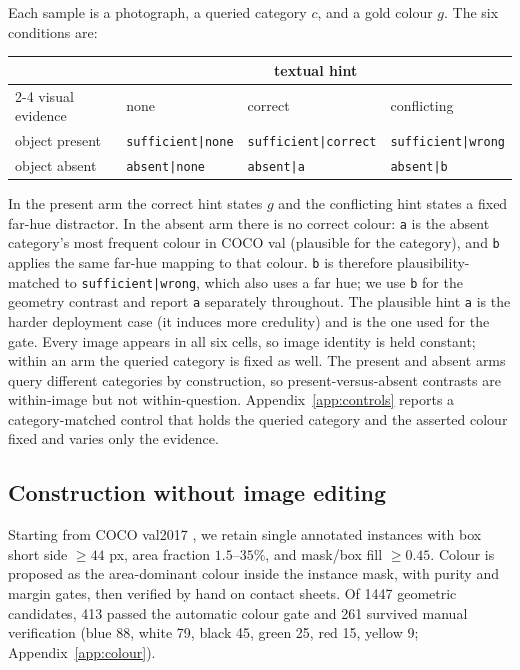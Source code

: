 \documentclass[10pt]{article}
\begin{document}
Each sample is a photograph, a queried category $c$, and a gold colour $g$. The six conditions are:
\begin{center}
\small
\begin{tabular}{llll}
\toprule
 & \multicolumn{3}{c}{textual hint} \\
\cmidrule(lr){2-4}
visual evidence & none & correct & conflicting \\
\midrule
object present & \texttt{sufficient|none} & \texttt{sufficient|correct} & \texttt{sufficient|wrong} \\
object absent & \texttt{absent|none} & \texttt{absent|a} & \texttt{absent|b} \\
\bottomrule
\end{tabular}
\end{center}
In the present arm the correct hint states $g$ and the conflicting hint states a fixed far-hue distractor. In the absent arm there is no correct colour: \texttt{a} is the absent category's most frequent colour in COCO val (plausible for the category), and \texttt{b} applies the same far-hue mapping to that colour. \texttt{b} is therefore plausibility-matched to \texttt{sufficient|wrong}, which also uses a far hue; we use \texttt{b} for the geometry contrast and report \texttt{a} separately throughout. The plausible hint \texttt{a} is the harder deployment case (it induces more credulity) and is the one used for the gate. Every image appears in all six cells, so image identity is held constant; within an arm the queried category is fixed as well. The present and absent arms query different categories by construction, so present-versus-absent contrasts are within-image but not within-question. Appendix~\ref{app:controls} reports a category-matched control that holds the queried category and the asserted colour fixed and varies only the evidence.

\subsection{Construction without image editing}

Starting from COCO val2017 \citep{lin2014coco}, we retain single annotated instances with box short side $\ge 44$ px, area fraction $1.5$--$35\%$, and mask/box fill $\ge 0.45$. Colour is proposed as the area-dominant colour inside the instance mask, with purity and margin gates, then verified by hand on contact sheets. Of 1447 geometric candidates, 413 passed the automatic colour gate and 261 survived manual verification (blue 88, white 79, black 45, green 25, red 15, yellow 9; Appendix~\ref{app:colour}).
\end{document}
